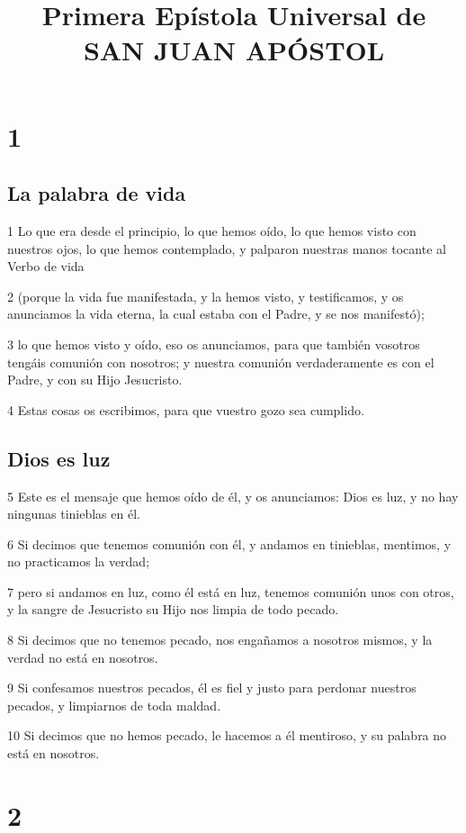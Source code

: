 
\title{Primera Epístola Universal de SAN JUAN APÓSTOL}


\chapter{1}

\section*{La palabra de vida}

\par 1 Lo que era desde el principio, lo que hemos oído, lo que hemos visto con nuestros ojos, lo que hemos contemplado, y palparon nuestras manos tocante al Verbo de vida
\par 2 (porque la vida fue manifestada, y la hemos visto, y testificamos, y os anunciamos la vida eterna, la cual estaba con el Padre, y se nos manifestó);
\par 3 lo que hemos visto y oído, eso os anunciamos, para que también vosotros tengáis comunión con nosotros; y nuestra comunión verdaderamente es con el Padre, y con su Hijo Jesucristo.
\par 4 Estas cosas os escribimos, para que vuestro gozo sea cumplido.

\section*{Dios es luz}

\par 5 Este es el mensaje que hemos oído de él, y os anunciamos: Dios es luz, y no hay ningunas tinieblas en él.
\par 6 Si decimos que tenemos comunión con él, y andamos en tinieblas, mentimos, y no practicamos la verdad;
\par 7 pero si andamos en luz, como él está en luz, tenemos comunión unos con otros, y la sangre de Jesucristo su Hijo nos limpia de todo pecado.
\par 8 Si decimos que no tenemos pecado, nos engañamos a nosotros mismos, y la verdad no está en nosotros.
\par 9 Si confesamos nuestros pecados, él es fiel y justo para perdonar nuestros pecados, y limpiarnos de toda maldad.
\par 10 Si decimos que no hemos pecado, le hacemos a él mentiroso, y su palabra no está en nosotros.

\chapter{2}

